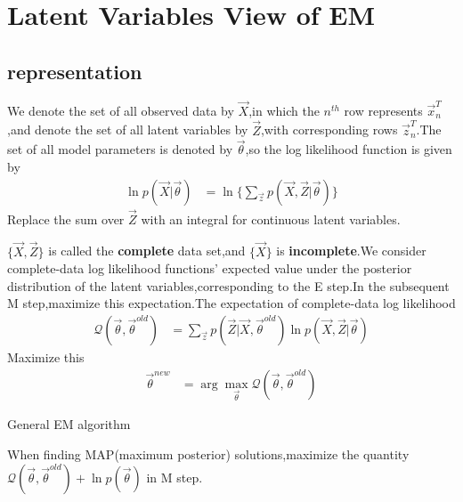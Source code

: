 \section{Latent Variables View of EM}
\subsection{representation}
We denote the set of all observed data by $\vec{X}$,in which the $n^{th}$ row represents $\vec{x}_n^T$,and denote the set of all latent variables by $\vec{Z}$,with corresponding rows $\vec{z}_n^T$.The set of all model parameters is denoted by $\vec{\theta}$,so the log likelihood function is given by
\begin{align}
\ln p(\vec{X}|\vec{\theta}) &=
\ln\{\sum_{\vec{z}}p(\vec{X},\vec{Z}|\vec{\theta}) \}
\end{align}
Replace the sum over $\vec{Z}$ with an integral for continuous latent variables.

$\{\vec{X},\vec{Z}\}$ is called the \textbf{complete} data set,and $\{\vec{X}\}$ is \textbf{incomplete}.We consider complete-data log likelihood functions' expected value under the posterior distribution of the latent variables,corresponding to the E step.In the subsequent M step,maximize this expectation.The expectation of complete-data log likelihood
\begin{align}
\mathcal{Q}(\vec{\theta},\vec{\theta}^{old}) &=
\sum_{\vec{z}}p(\vec{Z}|\vec{X},\vec{\theta}^{old})\ln p(\vec{X},\vec{Z}|\vec{\theta})
\end{align}
Maximize this
\begin{align}
\vec{\theta}^{new} &=\arg\max\limits_{\vec{\theta}}\mathcal{Q}(\vec{\theta},\vec{\theta}^{old})
\end{align}
\begin{algorithm}
	\label{General EM algorithm}
	\caption{General EM algorithm}
	\DontPrintSemicolon
\end{algorithm}
When finding MAP(maximum posterior) solutions,maximize the quantity $\mathcal{Q}(\vec{\theta},\vec{\theta}^{old})+\ln p(\vec{\theta})$ in M step.


